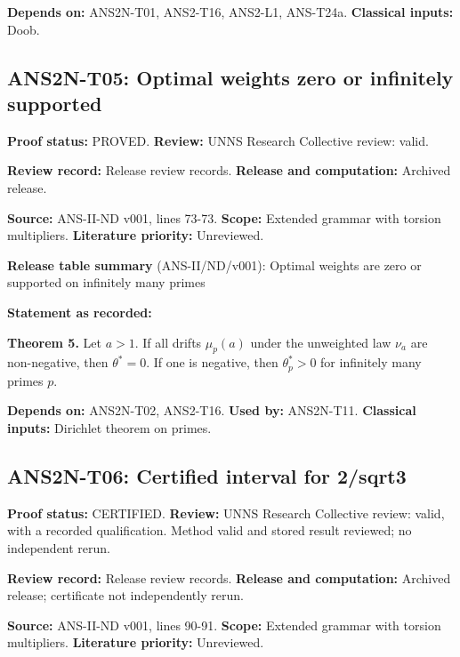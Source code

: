 \documentclass[
  11pt,
]{article}
\begin{document}
\textbf{Depends on:} ANS2N-T01, ANS2-T16, ANS2-L1, ANS-T24a.
\textbf{Classical inputs:} Doob.

\hypertarget{ans2n-t05-optimal-weights-zero-or-infinitely-supported}{%
\subsection{ANS2N-T05: Optimal weights zero or infinitely
supported}\label{ans2n-t05-optimal-weights-zero-or-infinitely-supported}}

\textbf{Proof status:} PROVED. \textbf{Review:} UNNS Research Collective
review: valid.

\textbf{Review record:} Release review records. \textbf{Release and
computation:} Archived release.

\textbf{Source:} ANS-II-ND v001, lines 73-73. \textbf{Scope:} Extended
grammar with torsion multipliers. \textbf{Literature priority:}
Unreviewed.

\textbf{Release table summary} (ANS-II/ND/v001): Optimal weights are
zero or supported on infinitely many primes

\textbf{Statement as recorded:}

\textbf{Theorem 5.} Let \(a>1\). If all drifts \(\mu_p(a)\) under the
unweighted law \(\nu_a\) are non-negative, then \(\theta^\ast=0\). If
one is negative, then \(\theta^\ast_p>0\) for infinitely many primes
\(p\).

\textbf{Depends on:} ANS2N-T02, ANS2-T16. \textbf{Used by:} ANS2N-T11.
\textbf{Classical inputs:} Dirichlet theorem on primes.

\hypertarget{ans2n-t06-certified-interval-for-2sqrt3}{%
\subsection{ANS2N-T06: Certified interval for
2/sqrt3}\label{ans2n-t06-certified-interval-for-2sqrt3}}

\textbf{Proof status:} CERTIFIED. \textbf{Review:} UNNS Research
Collective review: valid, with a recorded qualification. Method valid
and stored result reviewed; no independent rerun.

\textbf{Review record:} Release review records. \textbf{Release and
computation:} Archived release; certificate not independently rerun.

\textbf{Source:} ANS-II-ND v001, lines 90-91. \textbf{Scope:} Extended
grammar with torsion multipliers. \textbf{Literature priority:}
Unreviewed.
\end{document}
